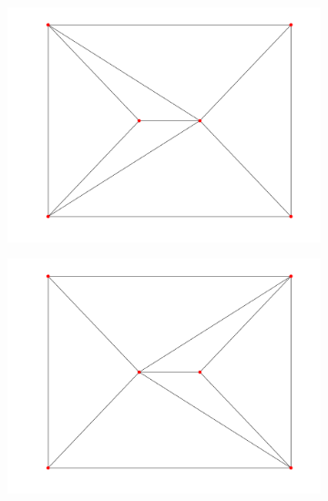 \begin{figure}[ht]
    \centering
    \begin{subfigure}[t]{0.4\textwidth}
        \centering
        \includegraphics[width=\textwidth]{report/Images/Theory/triangulation/triangulation_delaunay.png}
        \label{fig:triangulation-delaunay1}
    \end{subfigure}
    \begin{subfigure}[t]{0.4\textwidth}
        \centering
        \includegraphics[width=\textwidth]{report/Images/Theory/triangulation/triangulation_delaunay2.png}
        \label{fig:triangulation-delaunay2}
    \end{subfigure}
    \begin{subfigure}[b]{0.4\textwidth}

\end{subfigure}
\end{figure}
